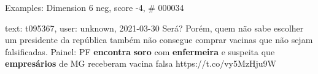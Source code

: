 \begin{frame}{Examples: Dimension 6 neg, score -4, \# 000034}
\footnotesize
\begin{alertblock}{text: t095367, user: unknown, 2021-03-30}
Será? Porém, quem não sabe escolher um presidente da república também não 
consegue comprar vacinas que não sejam falsificadas. Painel: PF 
\textbf{encontra} \textbf{soro} com \textbf{enfermeira} e suspeita que 
\textbf{empresários} de MG receberam vacina falsa https://t.co/vy5MzHju9W 
\end{alertblock}
\end{frame}
